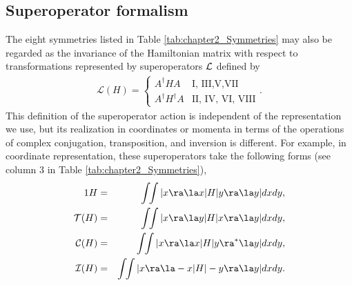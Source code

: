 %
%
\subsection{Superoperator formalism \label{sec:chapter2_super}}
The eight symmetries listed in Table \ref{tab:chapter2_Symmetries} may also be regarded as the invariance
of the Hamiltonian matrix with respect to
transformations represented by superoperators ${\cal L}$ \cite{Simon2018} defined by
%
\begin{eqnarray}
	\mathcal{L}(H)=
	\begin{cases}
		A^\dagger H A &  \text{I, III,V,VII} \\
		A^\dagger H^\dagger A &\text{II, IV, VI, VIII}
		\end{cases}.
\end{eqnarray}
%
%
%
This definition of the superoperator action is independent of the representation we use, but its realization
in coordinates or momenta in terms of the operations of complex conjugation, transposition, and inversion is different.
For example, in coordinate representation, these superoperators take the following forms (see column 3 in Table \ref{tab:chapter2_Symmetries}),
%
\begin{eqnarray}
	1 H&=&\int\!\!\int |x\ra \la x|H|y\ra\la y| dx dy,
	\nonumber\\
	{\cal T} (H) &=&\int\!\!\int |x\ra \la y|H|x\ra\la y| dx dy,
	\nonumber\\
	{\cal C} (H)&=&\int\!\!\int |x\ra \la x|H|y\ra^*\la y| dx dy,
	\nonumber\\
	{\cal I} (H)&=&\int\!\!\int |x\ra \la -x|H|-y\ra\la y| dx dy.
	\label{defs}
\end{eqnarray}
%
